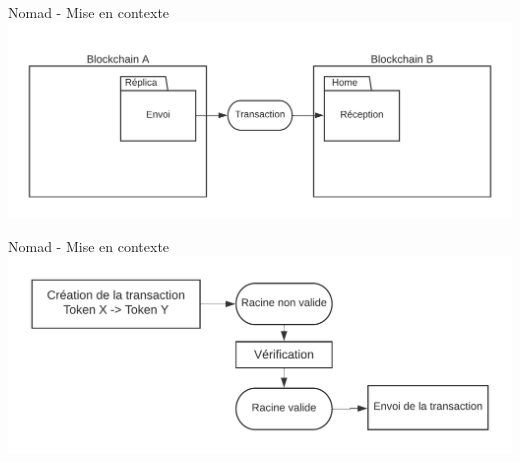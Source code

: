 \begin{frame}{Nomad - Mise en contexte}
    \centering
    \includegraphics[scale = 0.8]{centralisation/img/nomad/nomad_contracts.png}
\end{frame}


\begin{frame}{Nomad - Mise en contexte}
    \centering
    \includegraphics[scale = 0.9]{centralisation/img/nomad/nomad_fonc.png}
\end{frame}

